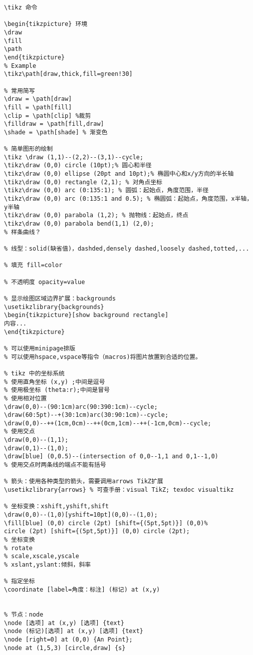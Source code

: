 \documentclass{report}
\begin{document}
\begin{verbatim}
\tikz 命令

\begin{tikzpicture} 环境
\draw
\fill
\path
\end{tikzpicture}
% Example
\tikz\path[draw,thick,fill=green!30]

% 常用简写
\draw = \path[draw]
\fill = \path[fill]
\clip = \path[clip] %裁剪
\filldraw = \path[fill,draw]
\shade = \path[shade] % 渐变色

% 简单图形的绘制
\tikz \draw (1,1)--(2,2)--(3,1)--cycle;
\tikz\draw (0,0) circle (10pt);% 圆心和半径
\tikz\draw (0,0) ellipse (20pt and 10pt);% 椭圆中心和x/y方向的半长轴
\tikz\draw (0,0) rectangle (2,1); % 对角点坐标
\tikz\draw (0,0) arc (0:135:1); % 圆弧：起始点，角度范围，半径
\tikz\draw (0,0) arc (0:135:1 and 0.5); % 椭圆弧：起始点，角度范围，x半轴，y半轴
\tikz\draw (0,0) parabola (1,2); % 抛物线：起始点，终点
\tikz\draw (0,0) parabola bend(1,1) (2,0);
% 样条曲线？

% 线型：solid(缺省值)，dashded,densely dashed,loosely dashed,totted,...

% 填充 fill=color

% 不透明度 opacity=value

% 显示绘图区域边界扩展：backgrounds
\usetikzlibrary{backgrounds}
\begin{tikzpicture}[show background rectangle]
内容...
\end{tikzpicture}

% 可以使用minipage排版
% 可以使用hspace,vspace等指令（macros)将图片放置到合适的位置。

% tikz 中的坐标系统
% 使用直角坐标 (x,y) ;中间是逗号
% 使用极坐标 (theta:r);中间是冒号
% 使用相对位置
\draw(0,0)--(90:1cm)arc(90:390:1cm)--cycle;
\draw(60:5pt)--+(30:1cm)arc(30:90:1cm)--cycle;
\draw(0,0)--++(1cm,0cm)--++(0cm,1cm)--++(-1cm,0cm)--cycle;
% 使用交点
\draw(0,0)--(1,1);
\draw(0,1)--(1,0);
\draw[blue] (0,0.5)--(intersection of 0,0--1,1 and 0,1--1,0)
% 使用交点时两条线的端点不能有括号

% 箭头：使用各种类型的箭头，需要调用arrows TikZ扩展
\usetikzlibrary{arrows} % 可查手册：visual TikZ; texdoc visualtikz

% 坐标变换：xshift,yshift,shift
\draw(0,0)--(1,0)[yshift=10pt](0,0)--(1,0);
\fill[blue] (0,0) circle (2pt) [shift={(5pt,5pt)}] (0,0)%
circle (2pt) [shift={(5pt,5pt)}] (0,0) circle (2pt);
% 坐标变换
% rotate
% scale,xscale,yscale
% xslant,yslant:倾斜，斜率

% 指定坐标
\coordinate [label=角度：标注] (标记) at (x,y)


% 节点：node
\node [选项] at (x,y) [选项] {text}
\node (标记)[选项] at (x,y) [选项] {text}
\node [right=0] at (0,0) {An Point};
\node at (1,5,3) [circle,draw] {s}


\end{verbatim}
\end{document}
